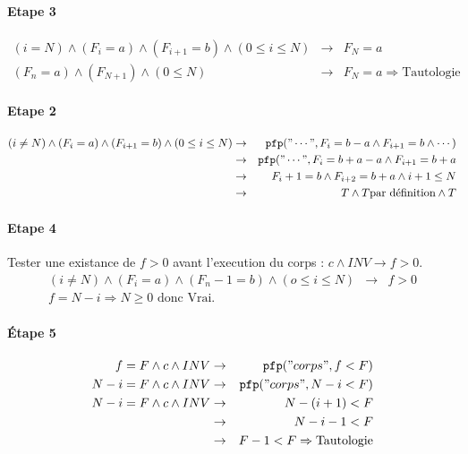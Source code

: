 \paragraph{Etape 3}
\begin{eqnarray*}
(i = N) \wedge (F_i = a) \wedge (F_{i+1} = b) \wedge (0 \leq i \leq N) &\rightarrow& F_N = a\\
(F_n = a) \wedge (F_{N+1}) \wedge (0 \leq N) &\rightarrow& F_N = a \Rightarrow \textrm{Tautologie}
\end{eqnarray*}

\paragraph{Etape 2}
\begin{eqnarray*}
(i \neq N) \wedge (F_i = a) \wedge (F_{i+1} = b) \wedge (0 \leq i \leq N) &\rightarrow& \pfp("\cdots", F_i=b-a \wedge F_{i+1} = b \wedge \cdots)\\
&\rightarrow& \pfp ("\cdots", F_i = b+a - a \wedge F_{i+1} = b+a\\
&\rightarrow& F_i+1 = b \wedge F_{i+2} = b + a \wedge i+1 \leq N\\
&\rightarrow& T \wedge T \textrm{par définition} \wedge T 
\end{eqnarray*}

\paragraph{Etape 4}
Tester une existance de $f > 0$ avant l'execution du corps : $c \wedge INV \rightarrow f > 0$.
\begin{eqnarray*}
(i \neq  N) \wedge (F_i = a) \wedge (F_n-1 = b) \wedge (o \leq i \leq N) &\rightarrow& f > 0\\
 f = N-i \Rightarrow N \geq 0\textrm{ donc Vrai.}
\end{eqnarray*}

\paragraph{\'Etape 5}
\begin{eqnarray*}
f = F \wedge c \wedge INV &\rightarrow& \pfp("corps", f < F)\\
N-i = F \wedge c \wedge INV &\rightarrow& \pfp("corps", N-i < F)\\
N - i = F \wedge c \wedge INV &\rightarrow& N - (i+1) < F\\
&\rightarrow& N -i-1 < F \\
&\rightarrow& F-1 < F \Rightarrow \textrm{Tautologie}
\end{eqnarray*}

